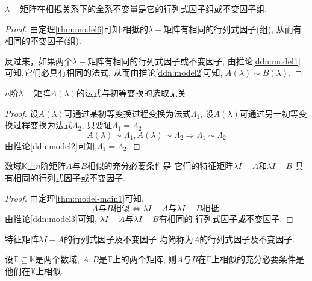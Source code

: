 \begin{deduction}\label{ddn:model3}
  $\lambda-$矩阵在相抵关系下的全系不变量是它的行列式因子组或不变因子组.
\end{deduction}
\begin{proof}
  由定理\ref{thm:model6}可知,相抵的$\lambda-$矩阵有相同的行列式因子(组),
  从而有相同的不变因子(组).
  
  反过来，如果两个$\lambda-$矩阵有相同的行列式因子或不变因子,
  由推论\ref{ddn:model1}可知,它们必具有相同的法式,
  从而由推论\ref{ddn:model2}可知, $A(\lambda)\sim B(\lambda)$.
\end{proof}

\begin{deduction}\label{ddn:model4}
  $n$阶$\lambda-$矩阵$A(\lambda)$的法式与初等变换的选取无关.
\end{deduction}
\begin{proof}
  设$A(\lambda)$可通过某初等变换过程变换为法式$\Lambda_1$,
  设$A(\lambda)$可通过另一初等变换过程变换为法式$\Lambda_2$,
  只要证$\Lambda_1=\Lambda_2$.
  \[A(\lambda)\sim \Lambda_1,
    A(\lambda)\sim \Lambda_2
    \Longrightarrow \Lambda_1 \sim \Lambda_2\]
  由推论\ref{ddn:model2}可知,$\Lambda_1= \Lambda_2$.
\end{proof}
\begin{theorem}\label{thm:model7}
  数域$\mathbb{K}$上$n$阶矩阵$A$与$B$相似的充分必要条件是
  它们的特征矩阵$\lambda I-A$和$\lambda I-B$
  具有相同的行列式因子或不变因子.
\end{theorem}
\begin{proof}
  由定理\ref{thm:model-main1}可知,
  \[A\text{与}B\text{相似} \Longleftrightarrow
    \lambda I -A\text{与}\lambda I-B\text{相抵}.\]
  由推论\ref{ddn:model3}可知,
  $\lambda I -A$与$\lambda I-B$有相同的
  行列式因子或不变因子.
\end{proof}
\begin{notice}
  特征矩阵$\lambda I -A$的行列式因子及不变因子
  均简称为$A$的行列式因子及不变因子.
\end{notice}
\begin{deduction}
  设$\mathbb{F}\subseteq \mathbb{K}$是两个数域,
  $A,B$是$\mathbb{F}$上的两个矩阵,
  则$A$与$B$在$\mathbb{F}$上相似的充分必要条件是
  他们在$\mathbb{K}$上相似.
\end{deduction}
